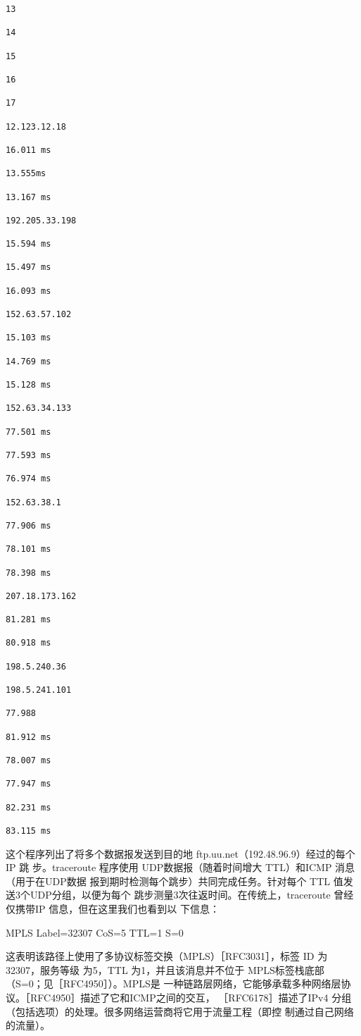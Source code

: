 \begin{verbatim}
13

14

15

16

17

12.123.12.18

16.011 ms

13.555ms

13.167 ms

192.205.33.198

15.594 ms

15.497 ms

16.093 ms

152.63.57.102

15.103 ms

14.769 ms

15.128 ms

152.63.34.133

77.501 ms

77.593 ms

76.974 ms

152.63.38.1

77.906 ms

78.101 ms

78.398 ms

207.18.173.162

81.281 ms

80.918 ms

198.5.240.36

198.5.241.101

77.988

81.912 ms

78.007 ms

77.947 ms

82.231 ms

83.115 ms
\end{verbatim}

这个程序列出了将多个数据报发送到目的地 ftp.uu.net（192.48.96.9）经过的每个IP 跳
步。traceroute 程序使用 UDP数据报（随着时间增大 TTL）和ICMP 消息（用于在UDP数据
报到期时检测每个跳步）共同完成任务。针对每个 TTL 值发送3个UDP分组，以便为每个
跳步测量3次往返时间。在传统上，traceroute 曾经仅携带IP 信息，但在这里我们也看到以
下信息：

MPLS Label=32307 CoS=5 TTL=1 S=0

这表明该路径上使用了多协议标签交换（MPLS）［RFC3031］，标签 ID 为32307，服务等级
为5，TTL 为1，并且该消息并不位于 MPLS标签栈底部（S=0；见［RFC4950］）。MPLS是
一种链路层网络，它能够承载多种网络层协议。［RFC4950］描述了它和ICMP之间的交互，
［RFC6178］描述了IPv4 分组（包括选项）的处理。很多网络运营商将它用于流量工程（即控
制通过自己网络的流量）。

